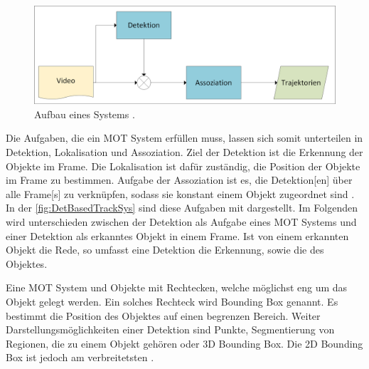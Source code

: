 \begin{figure}[htb]
\centering
\includegraphics[width=1\textwidth]{img/Grafiken/Detektionsbasiertes Tracking.png}
\caption{Aufbau eines  Systems \cite{Luo.2022}.}
\label{fig:DetBasedTrackSys}
\end{figure}


Die Aufgaben, die ein \gls{MOT} System erfüllen muss, lassen sich somit unterteilen in \gls{Detektion}, \gls{Lokalisation} und \gls{Assoziation}. Ziel der \gls{Detektion} ist die Erkennung der Objekte im \gls{Frame}. Die \gls{Lokalisation} ist dafür zuständig, die Position der Objekte im \gls{Frame} zu bestimmen. Aufgabe der \gls{Assoziation} ist es, die \gls{Detektion}[en] über alle \gls{Frame}[s] zu verknüpfen, sodass sie konstant einem Objekt zugeordnet sind \cite{CLEAR.2008, HOTA}. In der \autoref{fig:DetBasedTrackSys} sind diese Aufgaben mit dargestellt. Im Folgenden wird unterschieden zwischen der \gls{Detektion} als Aufgabe eines \gls{MOT} Systems und einer \gls{Detektion} als erkanntes Objekt in einem \gls{Frame}. Ist von einem erkannten Objekt die Rede, so umfasst eine \gls{Detektion} die Erkennung, sowie die  des Objektes. \par

Eine \gls{MOT} System  und  Objekte mit Rechtecken, welche möglichst eng um das Objekt gelegt werden. Ein solches Rechteck wird \gls{Bounding Box} genannt. Es bestimmt die Position des Objektes auf einen begrenzen Bereich. Weiter Darstellungsmöglichkeiten einer \gls{Detektion} sind Punkte, Segmentierung von Regionen, die zu einem Objekt gehören oder 3D \gls{Bounding Box}. Die 2D \gls{Bounding Box} ist jedoch am verbreitetsten \cite{MOT15, HOTA, Luo.2022}. \par 

